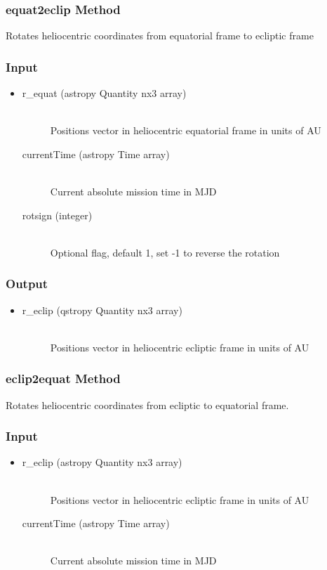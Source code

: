 \documentclass[cleanfoot]{asme2ej}
\begin{document}
\subsubsection{equat2eclip Method} \label{}
Rotates heliocentric coordinates from equatorial frame to ecliptic frame
\subsubsection*{Input}
\begin{itemize}
\item
\begin{description}
    \item[r\_equat (astropy Quantity nx3 array)] \hfill \\ Positions vector in heliocentric equatorial frame in units of AU
    \item[currentTime (astropy Time array)] \hfill \\ Current absolute mission time in MJD
    \item[rotsign (integer)] \hfill \\ Optional flag, default 1, set -1 to reverse the rotation
\end{description}
\end{itemize}
\subsubsection*{Output}
\begin{itemize}
\item
\begin{description}
    \item[r\_eclip (qstropy Quantity nx3 array)] \hfill \\ Positions vector in heliocentric ecliptic frame in units of AU
\end{description}
\end{itemize}

\subsubsection{eclip2equat Method} \label{}
Rotates heliocentric coordinates from ecliptic to equatorial frame.
\subsubsection*{Input}
\begin{itemize}
\item
\begin{description}
    \item[r\_eclip (astropy Quantity nx3 array)] \hfill \\ Positions vector in heliocentric ecliptic frame in units of AU
    \item[currentTime (astropy Time array)] \hfill \\ Current absolute mission time in MJD
\end{description}
\end{itemize}
\end{document}

